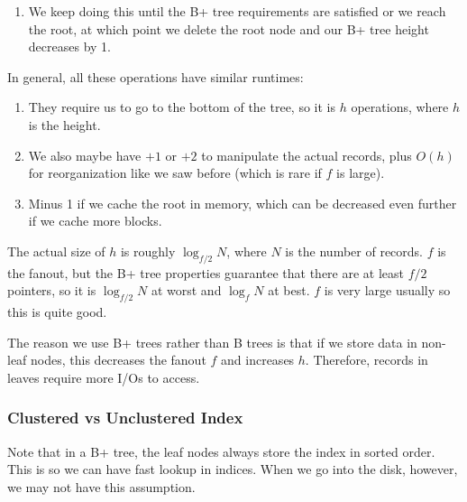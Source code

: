 \documentclass{article}
\begin{document}
\begin{algo}[Deletion]
\begin{enumerate}
          \item We keep doing this until the B+ tree requirements are satisfied or we reach the root, at which point we delete the root node and our B+ tree height decreases by 1. 
        \end{enumerate}
      \end{algo}

      \begin{theorem}
        In general, all these operations have similar runtimes: 
        \begin{enumerate}
          \item They require us to go to the bottom of the tree, so it is $h$ operations, where $h$ is the height. 
          \item We also maybe have $+1$ or $+2$ to manipulate the actual records, plus $O(h)$ for reorganization like we saw before (which is rare if $f$ is large). 
          \item Minus 1 if we cache the root in memory, which can be decreased even further if we cache more blocks. 
        \end{enumerate}
        
        The actual size of $h$ is roughly $\log_{f/2} {N}$, where $N$ is the number of records. $f$ is the fanout, but the B+ tree properties guarantee that there are at least $f/2$ pointers, so it is $\log_{f/2} N$ at worst and $\log_{f} N$ at best. $f$ is very large usually so this is quite good. 
      \end{theorem}
      
      The reason we use B+ trees rather than B trees is that if we store data in non-leaf nodes, this decreases the fanout $f$ and increases $h$. Therefore, records in leaves require more I/Os to access. 

    \subsubsection{Clustered vs Unclustered Index} 

      Note that in a B+ tree, the leaf nodes always store the index in sorted order. This is so we can have fast lookup in indices. When we go into the disk, however, we may not have this assumption.  
\end{document}
